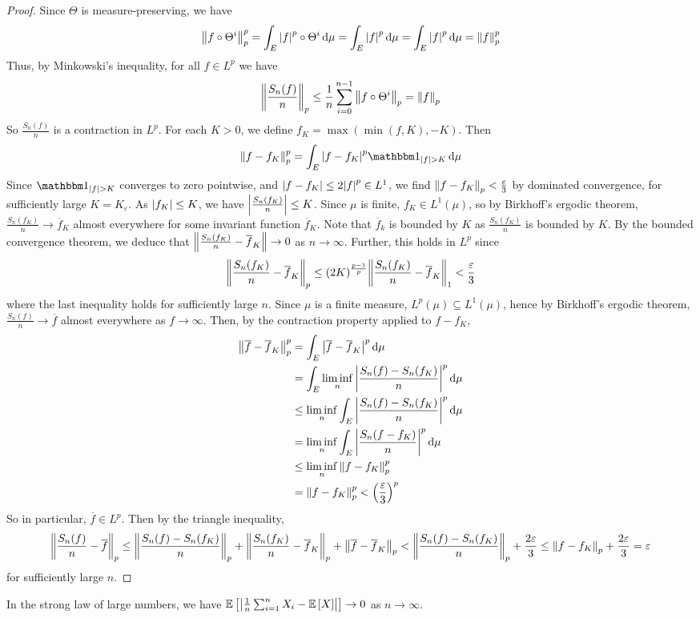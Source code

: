 \begin{proof}
	Since \( \Theta \) is measure-preserving, we have
	\[ \norm{f \circ \Theta^i}_p^p = \int_E \abs{f}^p \circ \Theta^i \dd{\mu} = \int_E \abs{f}^p \dd{\mu} = \int_E \abs{f}^p \dd{\mu} = \norm{f}_p^p \]
	Thus, by Minkowski's inequality, for all \( f \in L^p \) we have
	\[ \norm{\frac{S_n(f)}{n}}_p \leq \frac{1}{n} \sum_{i=0}^{n-1} \norm{f \circ \Theta^i}_p = \norm{f}_p \]
	So \( \frac{S_n(f)}{n} \) is a contraction in \( L^p \).
	For each \( K > 0 \), we define \( f_K = \max(\min(f, K), -K) \).
	Then
	\[ \norm{f - f_K}_p^p = \int_E \abs{f - f_K}^p \mathbbm 1_{\abs{f} > K} \dd{\mu} \]
	Since \( \mathbbm 1_{\abs{f} > K} \) converges to zero pointwise, and \( \abs{f - f_K} \leq 2\abs{f}^p \in L^1 \), we find \( \norm{f - f_K}_p < \frac{\varepsilon}{3} \) by dominated convergence, for sufficiently large \( K = K_\varepsilon \).
	As \( \abs{f_K} \leq K \), we have \( \abs{\frac{S_n(f_K)}{n}} \leq K \).
	Since \( \mu \) is finite, \( f_K \in L^1(\mu) \), so by Birkhoff's ergodic theorem, \( \frac{S_n(f_K)}{n} \to \overline f_K \) almost everywhere for some invariant function \( \overline f_K \).
	Note that \( \overline f_k \) is bounded by \( K \) as \( \frac{S_n(f_K)}{n} \) is bounded by \( K \).
	By the bounded convergence theorem, we deduce that \( \norm{\frac{S_n(f_K)}{n} - \overline f_K} \to 0 \) as \( n \to \infty \).
	Further, this holds in \( L^p \) since
	\[ \norm{\frac{S_n(f_K)}{n} - \overline f_K}_p \leq (2K)^{\frac{p-1}{p}} \norm{\frac{S_n(f_K)}{n} - \overline f_K}_1 < \frac{\varepsilon}{3} \]
	where the last inequality holds for sufficiently large \( n \).
	Since \( \mu \) is a finite measure, \( L^p(\mu) \subseteq L^1(\mu) \), hence by Birkhoff's ergodic theorem, \( \frac{S_n(f)}{n} \to \overline f \) almost everywhere as \( f \to \infty \).
	Then, by the contraction property applied to \( f - f_K \),
	\begin{align*}
		\norm{\overline f - \overline f_K}_p^p &= \int_E \abs{\overline f - \overline f_K}^p \dd{\mu} \\
		&= \int_E \liminf_n \abs{\frac{S_n(f) - S_n(f_K)}{n}}^p \dd{\mu} \\
		&\leq \liminf_n \int_E \abs{\frac{S_n(f) - S_n(f_K)}{n}}^p \dd{\mu} \\
		&= \liminf_n \int_E \abs{\frac{S_n(f - f_K)}{n}}^p \dd{\mu} \\
		&\leq \liminf_n \norm{f - f_K}_p^p \\
		&= \norm{f - f_K}_p^p < \qty(\frac{\varepsilon}{3})^p
	\end{align*}
	So in particular, \( \overline f \in L^p \).
	Then by the triangle inequality,
	\[ \norm{\frac{S_n(f)}{n} - \overline f}_p \leq \norm{\frac{S_n(f) - S_n(f_K)}{n}}_p + \norm{\frac{S_n(f_K)}{n} - \overline f_K}_p + \norm{\overline f - \overline f_K}_p < \norm{\frac{S_n(f) - S_n(f_K)}{n}}_p + \frac{2\varepsilon}{3} \leq \norm{f - f_K}_p + \frac{2\varepsilon}{3} = \varepsilon \]
	for sufficiently large \( n \).
\end{proof}
\begin{corollary}
	In the strong law of large numbers, we have \( \mathbb{E}\left[{\abs{\frac{1}{n} \sum_{i=1}^n X_i - \mathbb{E}\left[{X}\right]}}\right] \to 0 \) as \( n \to \infty \).
\end{corollary}
